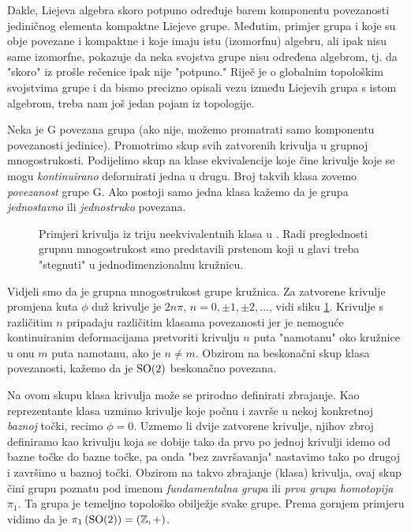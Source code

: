 Dakle, Liejeva algebra skoro potpuno određuje barem komponentu povezanosti
jediničnog elementa kompaktne Liejeve grupe.
Međutim, primjer grupa  i  koje su obje povezane i kompaktne i koje
imaju istu (izomorfnu) algebru, ali ipak nisu same izomorfne, pokazuje
da neka svojstva grupe nisu određena algebrom, tj. da "skoro" iz
prošle rečenice ipak nije "potpuno."
Riječ je o globalnim topološkim svojstvima grupe i
da bismo precizno opisali vezu između Liejevih grupa s istom algebrom, treba
nam još jedan pojam iz topologije.
\begin{definicija}
  Neka je G povezana grupa (ako nije, možemo promatrati samo komponentu
povezanosti jedinice). Promotrimo skup svih zatvorenih krivulja u grupnoj 
mnogostrukosti. Podijelimo skup  na klase ekvivalencije koje čine 
krivulje koje se mogu \emph{kontinuirano} deformirati jedna u drugu.
Broj takvih klasa zovemo \emph{povezanost} grupe G. Ako postoji samo
jedna klasa kažemo da je grupa \emph{jednostavno} ili \emph{jednostruko}
povezana.
\end{definicija}
\begin{figure}[htpb]
\centerline{}
\caption{Primjeri krivulja iz triju neekvivalentnih klasa u . Radi preglednosti
  grupnu mnogostrukost smo predstavili prstenom koji u glavi treba "stegnuti" u
   jednodimenzionalnu kružnicu.}
    \label{fig:so2homo}
\end{figure}
\begin{primjer}[\SO{2}]
Vidjeli smo da je grupna
mnogostrukost grupe  kružnica.
Za zatvorene krivulje promjena kuta $\phi$ duž krivulje je $2n\pi$,
$n=0,\pm 1, \pm 2, \ldots$, vidi sliku \ref{fig:so2homo}. Krivulje s različitim $n$ pripadaju
različitim klasama povezanosti jer je nemoguće kontinuiranim deformacijama
pretvoriti krivulju $n$ puta "namotanu" oko kružnice u onu $m$ puta namotanu,
ako je $n \neq m$. Obzirom na beskonačni skup klasa povezanosti,
kažemo da je $\mathrm{SO}(2)$ beskonačno povezana.
\end{primjer}
Na ovom skupu klasa krivulja može se prirodno
definirati zbrajanje. Kao reprezentante klasa uzmimo
krivulje koje počnu i završe u nekoj konkretnoj \emph{baznoj} točki, recimo $\phi=0$.
Uzmemo li dvije zatvorene krivulje, njihov zbroj definiramo kao krivulju koja se dobije tako da 
prvo po jednoj krivulji idemo od bazne točke do bazne točke, pa onda
"bez završavanja" nastavimo tako po drugoj i završimo u baznoj točki.
Obzirom na takvo zbrajanje (klasa) krivulja, ovaj skup čini grupu
poznatu pod imenom \emph{fundamentalna grupa} ili \emph{prva grupa homotopija} $\pi_1$. 
Ta grupa je temeljno topološko obilježje svake grupe. Prema gornjem
primjeru vidimo da je $\pi_1\left(\mathrm{SO}(2) \right) = (\mathbb{Z}, +)$.

